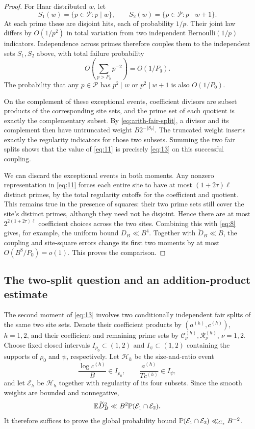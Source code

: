 \begin{proof}
For Haar distributed $w$, let
\[
 S_1(w)=\{p\in\mathcal P:p\mid w\},
 \qquad
 S_2(w)=\{p\in\mathcal P:p\mid w+1\}.
\]
At each prime these are disjoint hits, each of probability $1/p$.
Their joint law differs by $O(1/p^2)$ in total variation from two
independent Bernoulli$(1/p)$ indicators. Independence across primes
therefore couples them to the independent sets $S_1,S_2$ above, with
total failure probability
\[
 O\left(\sum_{p>P_0}p^{-2}\right)=O(1/P_0).
\]
The probability that any $p\in\mathcal P$ has $p^2\mid w$ or
$p^2\mid w+1$ is also $O(1/P_0)$.

On the complement of these exceptional events, coefficient divisors
are subset products of the corresponding site sets, and the prime set
of each quotient is exactly the complementary subset. By
\eqref{eq:arith-fair-split}, a divisor and its complement then have
untruncated weight $B2^{-|S_\nu|}$. The truncated weight inserts
exactly the regularity indicators for those two subsets. Summing the
two fair splits shows that the value of \eqref{eq:11} is precisely
\eqref{eq:13} on this successful coupling.

We can discard the exceptional events in both moments. Any nonzero
representation in \eqref{eq:11} forces each entire site to have at most
$(1+2\tau)\ell$ distinct primes, by the total regularity cutoffs for
the coefficient and quotient. This remains true in the presence of
squares: their two prime sets still cover the site's distinct primes,
although they need not be disjoint. Hence there are at most
$2^{2(1+2\tau)\ell}$ coefficient choices across the two sites.
Combining this with \eqref{eq:8} gives, for example, the uniform bound
$D_B\ll B^4$. Together with $\widetilde D_B\ll B$, the coupling and
site-square errors change its first two moments by at most
$O(B^8/P_0)=o(1)$. This proves the comparison.
\end{proof}

\subsection{The two-split question and an addition-product estimate}

The second moment of \eqref{eq:13} involves two conditionally
independent fair splits of the same two site sets. Denote their
coefficient products by $(a^{(h)},c^{(h)})$, $h=1,2$, and their
coefficient and remaining prime sets by
$\mathcal C_\nu^{(h)},\mathcal R_\nu^{(h)}$, $\nu=1,2$.
Choose fixed closed intervals
$I_{\rho_0}\subset(1,2)$ and $I_\psi\subset(1,2)$ containing the
supports of $\rho_0$ and $\psi$, respectively. Let $\mathcal H_h$
be the size-and-ratio event
\[
 \frac{\log c^{(h)}}B\in I_{\rho_0},
 \qquad
 \frac{a^{(h)}}{Tc^{(h)}}\in I_\psi,
\]
and let $\mathcal E_h$ be $\mathcal H_h$ together with regularity
of its four subsets. Since the smooth weights are bounded and
nonnegative,
\begin{equation}\label{eq:amp-two-split-reduction}
 \mathbb E\widetilde D_B^2
 \ll B^2\mathbb P(\mathcal E_1\cap\mathcal E_2).
\end{equation}
It therefore suffices to prove the global probability bound
$\mathbb P(\mathcal E_1\cap\mathcal E_2)\ll_{C_*}B^{-2}$.

